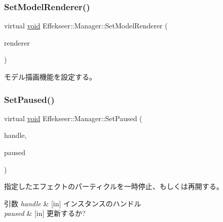 \subsubsection{\texorpdfstring{Set\+Model\+Renderer()}{SetModelRenderer()}}
{\footnotesize\ttfamily virtual \mbox{\hyperlink{namespace_effekseer_ab34c4088e512200cf4c2716f168deb56}{void}} Effekseer\+::\+Manager\+::\+Set\+Model\+Renderer (\begin{DoxyParamCaption}\item[{\mbox{\hyperlink{class_effekseer_1_1_model_renderer}{Model\+Renderer}} $\ast$}]{renderer }\end{DoxyParamCaption})\hspace{0.3cm}{\ttfamily [pure virtual]}}



モデル描画機能を設定する。 

\mbox{\label{class_effekseer_1_1_manager_a6414ea849302b7cef51b61a38c7ecd76}} 
\subsubsection{\texorpdfstring{Set\+Paused()}{SetPaused()}}
{\footnotesize\ttfamily virtual \mbox{\hyperlink{namespace_effekseer_ab34c4088e512200cf4c2716f168deb56}{void}} Effekseer\+::\+Manager\+::\+Set\+Paused (\begin{DoxyParamCaption}\item[{\mbox{\hyperlink{namespace_effekseer_afba58b8d812da862190e9bbfc040824a}{Handle}}}]{handle,  }\item[{bool}]{paused }\end{DoxyParamCaption})\hspace{0.3cm}{\ttfamily [pure virtual]}}



指定したエフェクトのパーティクルを一時停止、もしくは再開する。 


\begin{DoxyParams}{引数}
{\em handle} & \mbox{[}in\mbox{]} インスタンスのハンドル \\
\hline
{\em paused} & \mbox{[}in\mbox{]} 更新するか? \\
\hline
\end{DoxyParams}
\mbox{\label{class_effekseer_1_1_manager_a08c4c39a56fcc93b8acb284ff9bc933b}} 
